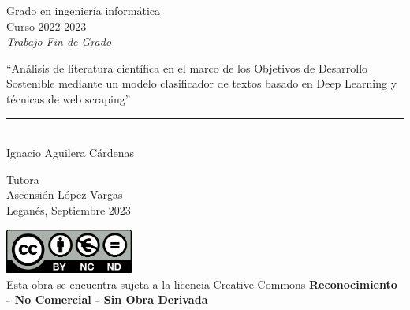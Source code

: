 \documentclass[12pt]{report} %
\begin{document}
	
\begin{titlepage}
	\begin{sffamily}
	\color{azulUC3M}
	\begin{center}
		\begin{figure}[H] %
		\end{figure}
		\vspace{2.5cm}
		\begin{Large}
			Grado en ingeniería informática\\			
			Curso 2022-2023\\
			\vspace{2cm}		
			\textsl{Trabajo Fin de Grado}
			\bigskip
			
		\end{Large}
		\begin{spacing}{1.7}
		 	{\Huge ``Análisis de literatura científica en el marco de los
		 	Objetivos de Desarrollo Sostenible mediante un modelo clasificador
		 	de textos basado en Deep Learning y técnicas de web scraping''}\\
		\end{spacing}
		 	\vspace*{0.5cm}
	 		\rule{10.5cm}{0.1mm}\\
			\vspace*{0.9cm}
			{\LARGE Ignacio Aguilera Cárdenas}\\ 
			\vspace*{1cm}
		\begin{Large}
			Tutora\\
			Ascensión López Vargas\\
			Leganés, Septiembre 2023\\
		\end{Large}
	\end{center}
	\vfill
	\color{black}
	\includegraphics[width=4.2cm]{imagenes/creativecommons.png}\\ %
	Esta obra se encuentra sujeta a la licencia Creative Commons \textbf{Reconocimiento - No Comercial - Sin Obra Derivada}
	\end{sffamily}
\end{titlepage}
\end{document}

